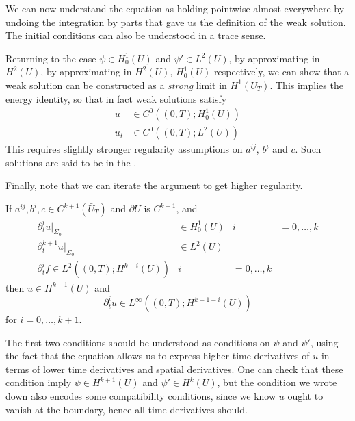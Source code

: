 \documentclass[a4paper]{article}
\begin{document}
We can now understand the equation as holding pointwise almost everywhere by undoing the integration by parts that gave us the definition of the weak solution. The initial conditions can also be understood in a trace sense.

Returning to the case $\psi \in H^1_0(U)$ and $\psi' \in L^2(U)$, by approximating in $H^2(U)$, by approximating in $H^2(U)$, $H_0^1(U)$ respectively, we can show that a weak solution can be constructed as a \emph{strong} limit in $H^1(U_T)$. This implies the energy identity, so that in fact weak solutions satisfy
\begin{align*}
  u &\in C^0((0, T); H_0^1(U))\\
  u_t &\in C^0((0, T); L^2(U))
\end{align*}
This requires slightly stronger regularity assumptions on $a^{ij}$, $b^i$ and $c$. Such solutions are said to be in the .

Finally, note that we can iterate the argument to get higher regularity.
\begin{thm}
  If $a^{ij}, b^i, c \in C^{k + 1}(\bar{U}_T)$ and $\partial U$ is $C^{k + 1}$, and
  \begin{align*}
    \partial^i_t u|_{\Sigma_0} &\in H_0^1 (U)&i &= 0, \ldots, k\\
    \partial_t^{k + 1}u |_{\Sigma_0} &\in L^2(U)\\
    \partial_t^i f \in L^2((0, T); H^{k - i}(U)) & i &= 0, \ldots, k
  \end{align*}
  then $u \in H^{k + 1}(U)$ and
  \[
    \partial_t^i u \in L^\infty((0, T); H^{k + 1 - i}(U))
  \]
  for $i = 0, \ldots, k + 1$.
\end{thm}
The first two conditions should be understood as conditions on $\psi$ and $\psi'$, using the fact that the equation allows us to express higher time derivatives of $u$ in terms of lower time derivatives and spatial derivatives. One can check that these condition imply $\psi \in H^{k + 1}(U)$ and $\psi' \in H^k(U)$, but the condition we wrote down also encodes some compatibility conditions, since we know $u$ ought to vanish at the boundary, hence all time derivatives should.

\end{document}
